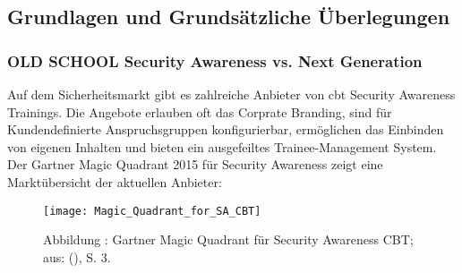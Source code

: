 \documentclass[../../main.tex]{subfiles}
\begin{document}
\subsection{Grundlagen und Grundsätzliche Überlegungen}

\subsubsection{OLD SCHOOL Security Awareness vs. Next Generation}
 
\begin{sloppypar}
Auf dem Sicherheitsmarkt gibt es zahlreiche Anbieter von \acrshort{cbt} Security Awareness Trainings. Die Angebote erlauben oft das Corprate Branding, sind für Kundendefinierte Anspruchsgruppen konfigurierbar, ermöglichen das Einbinden von eigenen Inhalten und bieten ein ausgefeiltes Trainee-Management System. Der Gartner Magic Quadrant 2015 für Security Awareness zeigt eine Marktübersicht der aktuellen Anbieter:
\end{sloppypar}

\addtocounter{figure}{1}
\begin{figure}[H]
\texttt{[image: Magic\_Quadrant\_for\_SA\_CBT]}
\caption*{Abbildung \thefigure: Gartner Magic Quadrant für Security Awareness CBT; aus: \citeauthor{walls_magic_2015} (\citeyear{walls_magic_2015}), S. 3.}
\label{gartnermagicquadrantsecurityawarenesscbt}
\end{figure}
\end{document}
